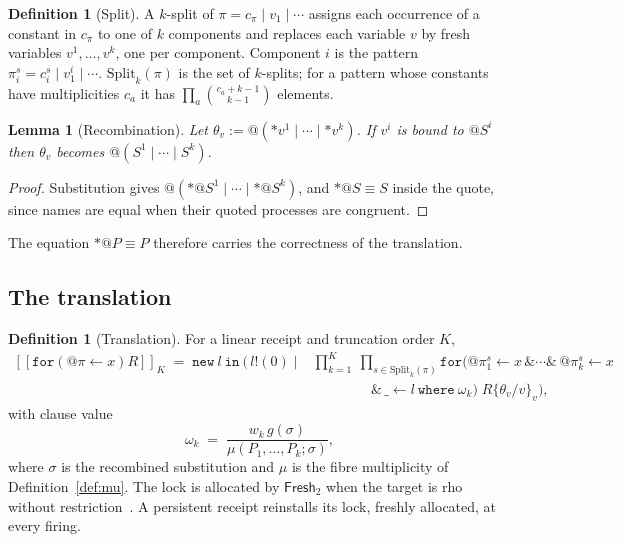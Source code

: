 \documentclass[11pt,a4paper]{article}
\theoremstyle{plain}
\newtheorem{lemma}[theorem]{Lemma}
\theoremstyle{definition}
\newtheorem{definition}[theorem]{Definition}
\theoremstyle{remark}
\newcommand{\rhoc}{\textsf{rho}}
\newcommand{\scong}{\equiv}
\newcommand{\Split}{\mathrm{Split}}
\newcommand{\Frsh}{\mathsf{Fresh}_2}
\newcommand{\tr}[1]{[\![#1]\!]}
\newcommand{\code}[1]{\texttt{#1}}
\begin{document}
\begin{definition}[Split]\label{def:split}
A $k$-split of $\pi = c_\pi \mid v_1\mid\cdots$ assigns each occurrence of a
constant in $c_\pi$ to one of $k$ components and replaces each variable $v$ by
fresh variables $v^1,\dots,v^k$, one per component. Component $i$ is the pattern
$\pi^s_i = c^s_i \mid v_1^i\mid\cdots$. $\Split_k(\pi)$ is the set of $k$-splits;
for a pattern whose constants have multiplicities $c_a$ it has
$\prod_a\binom{c_a+k-1}{k-1}$ elements.
\end{definition}

\begin{lemma}[Recombination]\label{lem:recombine}
Let $\theta_v := @(*v^1\mid\cdots\mid *v^k)$. If $v^i$ is bound to $@S^i$ then
$\theta_v$ becomes $@(S^1\mid\cdots\mid S^k)$.
\end{lemma}

\begin{proof}
Substitution gives $@(*@S^1\mid\cdots\mid *@S^k)$, and $*@S\scong S$ inside the
quote, since names are equal when their quoted processes are congruent.
\end{proof}

The equation $*@P\scong P$ therefore carries the correctness of the
translation.

\subsection{The translation}

\begin{definition}[Translation]\label{def:translation}
For a linear receipt and truncation order $K$,
\[
\begin{aligned}
\tr{\code{for}(@\pi\leftarrow x)R}_K \;=\;
\code{new}\ l\ \code{in}\ \Big(\, l!(0) \;\Big|\;
&\prod_{k=1}^{K}\ \prod_{s\in\Split_k(\pi)}
\code{for}(@\pi^s_1\leftarrow x \,\&\cdots\&\, @\pi^s_k\leftarrow x\\
&\qquad\qquad\,\&\, \_\leftarrow l\ \code{where}\ \omega_{k})\; R\{\theta_v/v\}_v \Big),
\end{aligned}
\]
with clause value
\[
\omega_k \;=\; \frac{w_k\, g(\sigma)}{\mu(P_1,\dots,P_k;\sigma)},
\]
where $\sigma$ is the recombined substitution and $\mu$ is the fibre
multiplicity of Definition~\ref{def:mu}. The lock is allocated by $\Frsh$ when
the target is \rhoc{} without restriction~\cite{NNS}. A persistent receipt
reinstalls its lock, freshly allocated, at every firing.
\end{definition}
\end{document}
